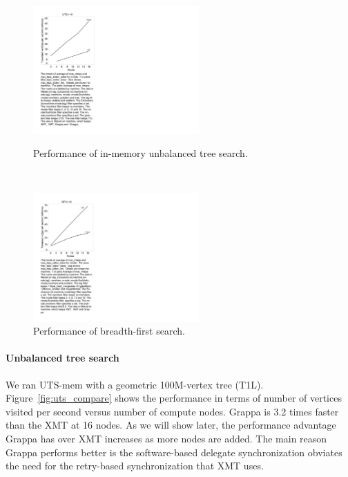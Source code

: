 \begin{figure}
\begin{center}

\hspace{-1in}\begin{minipage}{0.3\textwidth}
\begin{center}
\includegraphics[width=2.5in]{figs/uts_performance.pdf}
\caption{\label{fig:uts_compare} Performance of in-memory unbalanced tree search.}
\end{center}
\end{minipage}
\hspace{1.25in}\
\begin{minipage}{0.3\textwidth}
\begin{center}
\includegraphics[width=2.5in]{figs/bfs_performance}
\caption{\label{fig:bfs-performance} Performance of breadth-first search.}
\end{center}
\end{minipage}

\end{center}
\end{figure}

\paragraph{Unbalanced tree search} We ran UTS-mem with a geometric 100M-vertex
tree (T1L). Figure~\ref{fig:uts_compare} shows the performance in terms of
number of vertices visited per second versus number of compute nodes. Grappa
is 3.2 times faster than the XMT at 16 nodes. As we will show later, the
performance advantage Grappa has over XMT increases as more nodes are added.
The main reason Grappa performs better is the software-based delegate
synchronization obviates the need for the retry-based synchronization that XMT
uses.


